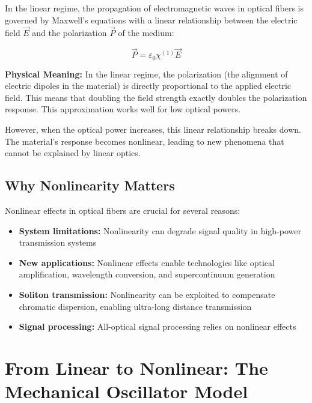 \documentclass[a4paper, 11pt]{article}
\begin{document}
In the linear regime, the propagation of electromagnetic waves in optical fibers is governed by Maxwell's equations with a linear relationship between the electric field $\vec{E}$ and the polarization $\vec{P}$ of the medium:

\begin{equation}
    \vec{P} = \varepsilon_0 \chi^{(1)} \vec{E}
    \label{eq:linear_polarization}
\end{equation}

\begin{physical}
\textbf{Physical Meaning:} In the linear regime, the polarization (the alignment of electric dipoles in the material) is directly proportional to the applied electric field. This means that doubling the field strength exactly doubles the polarization response. This approximation works well for low optical powers.
\end{physical}

However, when the optical power increases, this linear relationship breaks down. The material's response becomes nonlinear, leading to new phenomena that cannot be explained by linear optics.

\subsection{Why Nonlinearity Matters}

Nonlinear effects in optical fibers are crucial for several reasons:

\begin{itemize}[leftmargin=*]
    \item \textbf{System limitations:} Nonlinearity can degrade signal quality in high-power transmission systems
    \item \textbf{New applications:} Nonlinear effects enable technologies like optical amplification, wavelength conversion, and supercontinuum generation
    \item \textbf{Soliton transmission:} Nonlinearity can be exploited to compensate chromatic dispersion, enabling ultra-long distance transmission
    \item \textbf{Signal processing:} All-optical signal processing relies on nonlinear effects
\end{itemize}

\section{From Linear to Nonlinear: The Mechanical Oscillator Model}
\end{document}
